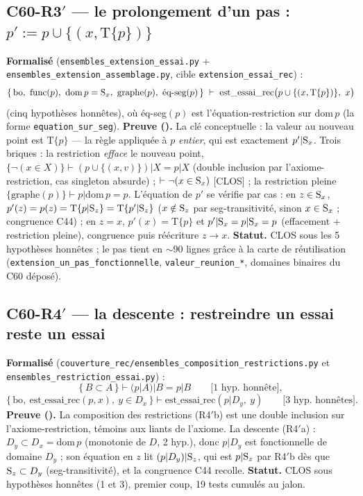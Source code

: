 \subsection{C60-R3$'$ --- le prolongement d'un pas : $p' := p \cup \{(x, \mathrm{T}\{p\})\}$}
\textbf{Formalisé} (\texttt{ensembles\_extension\_essai.py} +
\texttt{ensembles\_extension\_assemblage.py}, cible \texttt{extension\_essai\_rec}) :
\[
  \{\,\text{bo},\ \mathrm{func}(p),\ \mathrm{dom}\,p = \seg_x,\
     \mathrm{graphe}(p),\ \text{éq-seg}(p)\,\} \;\vdash\;
  \mathrm{est\_essai\_rec}\bigl(p \cup \{(x, \mathrm{T}\{p\})\},\ x\bigr)
\]
(cinq hypothèses honnêtes), où éq-seg$(p)$ est l'équation-restriction sur
$\mathrm{dom}\,p$ (la forme \texttt{equation\_sur\_seg}). \textbf{Preuve (\Nstar).} La clé conceptuelle : la
valeur au nouveau point est $\mathrm{T}\{p\}$ --- la règle appliquée à $p$
\emph{entier}, qui est exactement $p'|\mathrm{S}_x$. Trois briques : la restriction
\emph{efface} le nouveau point, $\{\neg(x \in X)\} \vdash (p \cup \{(x,v)\})|X
= p|X$ (double inclusion par l'axiome-restriction, cas singleton absurde) ;
$\vdash \neg(x \in \mathrm{S}_x)$ [CLOS] ; la restriction pleine
$\{\mathrm{graphe}(p)\} \vdash p|\mathrm{dom}\,p = p$. L'équation de $p'$ se
vérifie par cas : en $z \in \mathrm{S}_x$, $p'(z) = p(z) = \mathrm{T}\{p|\mathrm{S}_z\} =
\mathrm{T}\{p'|\mathrm{S}_z\}$ ($x \notin \mathrm{S}_z$ par seg-transitivité, sinon
$x \in \mathrm{S}_x$ ; congruence C44) ; en $z = x$, $p'(x) = \mathrm{T}\{p\}$ et
$p'|\mathrm{S}_x = p|\mathrm{S}_x = p$ (effacement + restriction pleine), congruence puis
réécriture $z \to x$. \textbf{Statut.} CLOS sous les 5 hypothèses honnêtes ;
le pas tient en $\sim$90 lignes grâce à la carte de réutilisation
(\texttt{extension\_un\_pas\_fonctionnelle}, \texttt{valeur\_reunion\_*},
domaines binaires du C60 déposé).

\subsection{C60-R4$'$ --- la descente : restreindre un essai reste un essai}
\textbf{Formalisé} (\texttt{couverture\_rec/ensembles\_composition\_restrictions.py}
et \texttt{ensembles\_restriction\_essai.py}) :
\[
  \{\,B \subset A\,\} \vdash (p|A)|B = p|B \qquad \text{[1 hyp.\ honnête]},
\]
\[
  \{\,\text{bo},\ \mathrm{est\_essai\_rec}(p, x),\ y \in D_x\,\} \vdash
  \mathrm{est\_essai\_rec}(p|D_y,\ y) \qquad \text{[3 hyp.\ honnêtes]}.
\]
\textbf{Preuve (\Nstar).} La composition des restrictions (R4$'$b) est une double
inclusion sur l'axiome-restriction, témoins aux liants de l'axiome. La descente
(R4$'$a) : $D_y \subset D_x = \mathrm{dom}\,p$ (monotonie de $D$, 2 hyp.), donc
$p|D_y$ est fonctionnelle de domaine $D_y$ ; son équation en $z$ lit
$(p|D_y)|\mathrm{S}_z$, qui est $p|\mathrm{S}_z$ par R4$'$b dès que $\mathrm{S}_z \subset D_y$
(seg-transitivité), et la congruence C44 recolle. \textbf{Statut.} CLOS sous
hypothèses honnêtes (1 et 3), premier coup, 19 tests cumulés au jalon.

